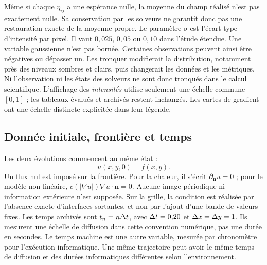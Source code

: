 Même si chaque $\eta_{ij}$ a une espérance nulle, la moyenne du champ
réalisé n'est pas exactement nulle. Sa conservation par les solveurs
ne garantit donc pas une restauration exacte de la moyenne propre.
Le paramètre $\sigma$ est l'écart-type d'intensité par pixel. Il vaut
$0{,}025$, $0{,}05$ ou $0{,}10$ dans l'étude étendue.
Une variable gaussienne n'est pas bornée. Certaines observations
peuvent ainsi être négatives ou dépasser un. Les tronquer modifierait
la distribution, notamment près des niveaux sombres et clairs, puis
changerait les données et les métriques. Ni l'observation ni les états
des solveurs ne sont donc tronqués dans le calcul scientifique.
L'affichage des \emph{intensités} utilise seulement une échelle commune
$[0,1]$ ; les tableaux évalués et archivés restent inchangés. Les cartes
de gradient ont une échelle distincte explicitée dans leur légende.

\subsection{Donnée initiale, frontière et temps}
Les deux évolutions commencent au même état :
\begin{equation}
 u(x,y,0)=f(x,y).
 \label{eq:initial-data}
\end{equation}
Un flux nul est imposé sur la frontière. Pour la chaleur, il s'écrit
$\partial_{\boldsymbol n}u=0$ ; pour le modèle non linéaire,
$c(|\nabla u|)\nabla u\cdot\boldsymbol n=0$. Aucune image périodique
ni information extérieure n'est supposée. Sur la grille, la condition
est réalisée par l'absence exacte d'interfaces sortantes, et non par
l'ajout d'une bande de valeurs fixes.
Les temps archivés sont $t_n=n\Delta t$, avec $\Delta t=0{,}20$ et
$\Delta x=\Delta y=1$. Ils mesurent une échelle de diffusion dans cette convention
numérique, pas une durée en secondes. Le temps machine est une autre
variable, mesurée par chronomètre pour l'exécution informatique. Une
même trajectoire peut avoir le même temps de diffusion et des durées
informatiques différentes selon l'environnement.
